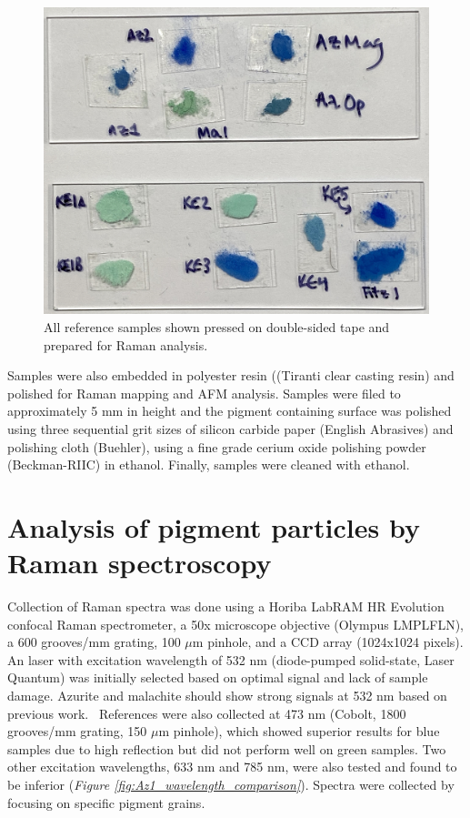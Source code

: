 \begin{figure}[H]
\centering
  \includegraphics[width=0.75\linewidth]{sample_slides}
\caption[All reference samples shown pressed on double-sided tape and prepared for Raman analysis.]{All reference samples shown pressed on double-sided tape and prepared for Raman analysis.}
\label{fig:sample_slides}
\end{figure}

Samples were also embedded in polyester resin ((Tiranti clear casting resin) and polished for Raman mapping and AFM analysis. Samples were filed to approximately 5 mm in height and the pigment containing surface was polished using three sequential grit sizes of silicon carbide paper (English Abrasives) and polishing cloth (Buehler), using a fine grade cerium oxide polishing powder (Beckman-RIIC) in ethanol. Finally, samples were cleaned with ethanol.

\section[Analysis of pigment particles by Raman spectroscopy]{Analysis of pigment particles by Raman spectroscopy}
\label{section2.2}

Collection of Raman spectra was done using a Horiba LabRAM HR Evolution confocal Raman spectrometer, a 50x microscope objective (Olympus LMPLFLN), a 600 grooves/mm grating, 100 $\mu$m pinhole, and a CCD array (1024x1024 pixels). An laser with excitation wavelength of 532 nm (diode-pumped solid-state, Laser Quantum) was initially selected based on optimal signal and lack of sample damage. Azurite and malachite should show strong signals at 532 nm based on previous work.~\autocite{Bicchieri} References were also collected at 473 nm (Cobolt, 1800 grooves/mm grating, 150 $\mu$m pinhole), which showed superior results for blue samples due to high reflection but did not perform well on green samples. Two other excitation wavelengths, 633 nm and 785 nm, were also tested and found to be inferior (\textit{Figure \ref{fig:Az1_wavelength_comparison}}). Spectra were collected by focusing on specific pigment grains.

